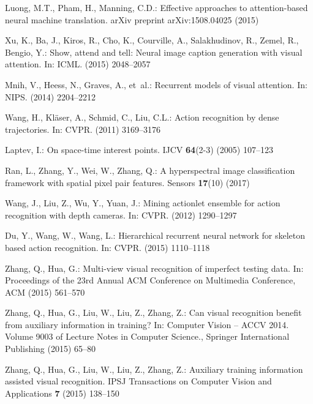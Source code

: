 \documentclass[runningheads,a4paper]{llncs}
\begin{document}
\begin{thebibliography}{10}
	Luong, M.T., Pham, H., Manning, C.D.:
	\newblock Effective approaches to attention-based neural machine translation.
	\newblock arXiv preprint arXiv:1508.04025 (2015)

	Xu, K., Ba, J., Kiros, R., Cho, K., Courville, A., Salakhudinov, R., Zemel, R.,
	Bengio, Y.:
	\newblock Show, attend and tell: Neural image caption generation with visual
	attention.
	\newblock In: ICML. (2015)  2048--2057

	Mnih, V., Heess, N., Graves, A.,  et~al.:
	\newblock Recurrent models of visual attention.
	\newblock In: NIPS. (2014)  2204--2212

	Wang, H., Kl{\"a}ser, A., Schmid, C., Liu, C.L.:
	\newblock Action recognition by dense trajectories.
	\newblock In: CVPR. (2011)  3169--3176

	Laptev, I.:
	\newblock On space-time interest points.
	\newblock IJCV \textbf{64}(2-3) (2005)  107--123

	Ran, L., Zhang, Y., Wei, W., Zhang, Q.:
	\newblock A hyperspectral image classification framework with spatial pixel
	pair features.
	\newblock Sensors \textbf{17}(10) (2017)

	Wang, J., Liu, Z., Wu, Y., Yuan, J.:
	\newblock Mining actionlet ensemble for action recognition with depth cameras.
	\newblock In: CVPR. (2012)  1290--1297

	Du, Y., Wang, W., Wang, L.:
	\newblock Hierarchical recurrent neural network for skeleton based action
	recognition.
	\newblock In: CVPR. (2015)  1110--1118

	Zhang, Q., Hua, G.:
	\newblock Multi-view visual recognition of imperfect testing data.
	\newblock In: Proceedings of the 23rd Annual ACM Conference on Multimedia
	Conference, ACM (2015)  561--570

	Zhang, Q., Hua, G., Liu, W., Liu, Z., Zhang, Z.:
	\newblock Can visual recognition benefit from auxiliary information in
	training?
	\newblock In: Computer Vision -- ACCV 2014. Volume 9003 of Lecture Notes in
	Computer Science., Springer International Publishing (2015)  65--80

	Zhang, Q., Hua, G., Liu, W., Liu, Z., Zhang, Z.:
	\newblock Auxiliary training information assisted visual recognition.
	\newblock IPSJ Transactions on Computer Vision and Applications \textbf{7}
	(2015)  138--150


\end{thebibliography}
\end{document}
